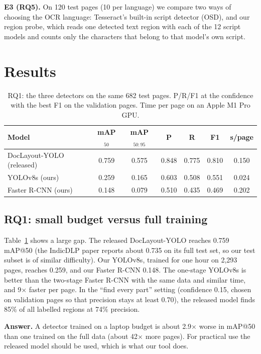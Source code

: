\documentclass[conference]{IEEEtran}
\begin{document}
\textbf{E3 (RQ5).} On 120 test pages (10 per language) we compare two ways of choosing the OCR language:
Tesseract's built-in script detector (OSD), and our region probe, which reads one detected text region with
each of the 12 script models and counts only the characters that belong to that model's own script.


\section{Results}

\begin{table}[t]
\centering
\caption{RQ1: the three detectors on the same 682 test pages. P/R/F1 at the confidence with the best F1 on the
validation pages. Time per page on an Apple M1 Pro GPU.}
\label{tab:overall}
\small
\setlength{\tabcolsep}{3.2pt}
\begin{tabular}{lcccccc}
\toprule
Model & mAP$_{50}$ & mAP$_{50:95}$ & P & R & F1 & s/page \\
\midrule
DocLayout-YOLO (released) & 0.759 & 0.575 & 0.848 & 0.775 & 0.810 & 0.150 \\
YOLOv8s (ours) & 0.259 & 0.165 & 0.603 & 0.508 & 0.551 & 0.024 \\
Faster R-CNN (ours) & 0.148 & 0.079 & 0.510 & 0.435 & 0.469 & 0.202 \\
\bottomrule
\end{tabular}
\end{table}

\subsection{RQ1: small budget versus full training}
Table~\ref{tab:overall} shows a large gap. The released DocLayout-YOLO reaches 0.759 mAP@50 (the IndicDLP paper
reports about 0.735 on its full test set, so our test subset is of similar difficulty). Our YOLOv8s, trained for
one hour on 2,293 pages, reaches 0.259, and our Faster R-CNN 0.148. The one-stage YOLOv8s is better than the two-stage
Faster R-CNN with the same data and similar time, and 9$\times$ faster per page. In the
``find every part'' setting (confidence 0.15, chosen on validation pages so that precision stays at least 0.70),
the released model finds 85\% of all labelled regions at 74\% precision.

\textbf{Answer.} A detector trained on a laptop budget is about 2.9$\times$ worse in mAP@50 than one trained on
the full data (about 42$\times$ more pages). For practical use the released model should be used, which is what
our tool does.
\end{document}
